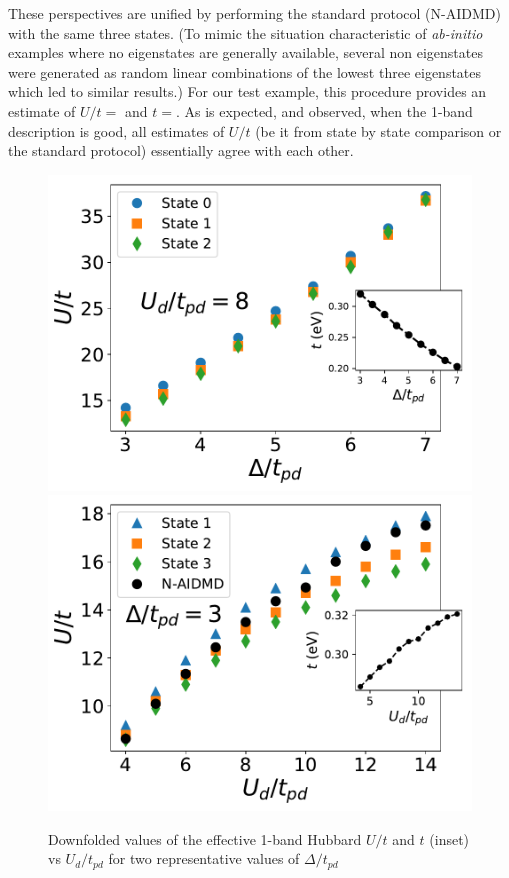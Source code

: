 These perspectives are unified by performing the standard protocol (N-AIDMD) with the same three states. 
(To mimic the situation characteristic of \textit{ab-initio} examples where no eigenstates are generally available, 
several non eigenstates were generated as random linear combinations of the lowest three eigenstates  which led to similar results.) 
For our test example, this procedure provides an estimate of $U/t = $ and $t = $. 
As is expected, and observed, when the 1-band description is good, all estimates of $U/t$ (be it from state by state comparison or the standard protocol) essentially agree with each other. 

\begin{figure}[]
\centering
\includegraphics[width=0.49\linewidth]{./Figures/U_and_hopping_combined_vs_ep_Ud_8.pdf}
\includegraphics[width=0.48\linewidth]{./Figures/U_and_hopping_combined_vs_Ud_ep_3.pdf}
\caption{Downfolded values of the effective 1-band Hubbard $U/t$ and $t$ (inset) 
vs $U_d/t_{pd}$ for two representative values of $\Delta/t_{pd}$}
\label{fig:hamfitUdvary} 
\end{figure}	
 
